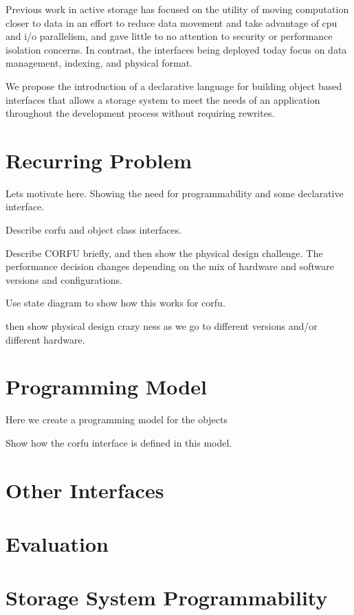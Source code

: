 \documentclass[10pt,twocolumn]{article}
\begin{document}

Previous work in active storage has focused on the utility of moving
computation closer to data in an effort to reduce data movement and take
advantage of cpu and i/o parallelism, and gave little to no attention to
security or performance isolation concerns. In contrast, the interfaces being
deployed today focus on data management, indexing, and physical format.

We propose the introduction of a declarative language for building object
based interfaces that allows a storage system to meet the needs of an
application throughout the development process without requiring rewrites.

\section{Recurring Problem}

Lets motivate here. Showing the need for programmability and some 
declarative interface.

Describe corfu and object class interfaces.

Describe CORFU briefly, and then show the physical design challenge. The
performance decision changes depending on the mix of hardware and software
versions and configurations.

Use state diagram to show how this works for corfu.

then show physical design crazy ness as we go to different
versions and/or different hardware.

\section{Programming Model}

Here we create a programming model for the objects

Show how the corfu interface is defined in this model.

\section{Other Interfaces}

\section{Evaluation}


\section{Storage System Programmability}
\end{document}
